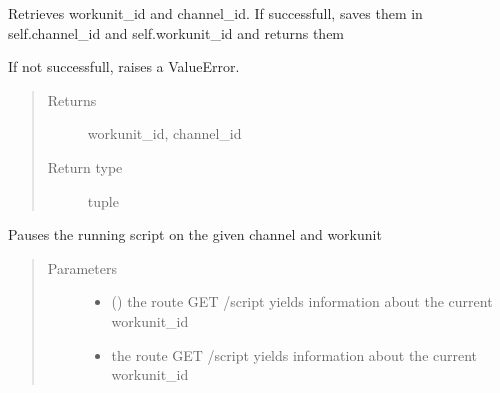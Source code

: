 \documentclass[letterpaper,10pt,english,openany,oneside]{sphinxmanual}
\begin{document}
\begin{fulllineitems}
\begin{fulllineitems}
\label{\detokenize{_modules/AconitySTUDIO_client:AconitySTUDIO_client.AconitySTUDIO_client.get_workunit_and_channel_id}}
Retrieves workunit\_id and channel\_id. If successfull,
saves them in self.channel\_id and self.workunit\_id and returns them

If not successfull, raises a ValueError.
\begin{quote}\begin{description}
\item[{Returns}] \leavevmode
workunit\_id, channel\_id

\item[{Return type}] \leavevmode
tuple

\end{description}\end{quote}

\end{fulllineitems}


\begin{fulllineitems}
\label{\detokenize{_modules/AconitySTUDIO_client:AconitySTUDIO_client.AconitySTUDIO_client.pause_job}}
Pauses the running script on the given channel and workunit
\begin{quote}\begin{description}
\item[{Parameters}] \leavevmode\begin{itemize}
\item {} 
 () \textendash{} the route GET /script yields information about the current workunit\_id

\item {} 
 \textendash{} the route GET /script yields information about the current workunit\_id

\end{itemize}

\end{description}\end{quote}


\end{fulllineitems}
\end{fulllineitems}
\end{document}
